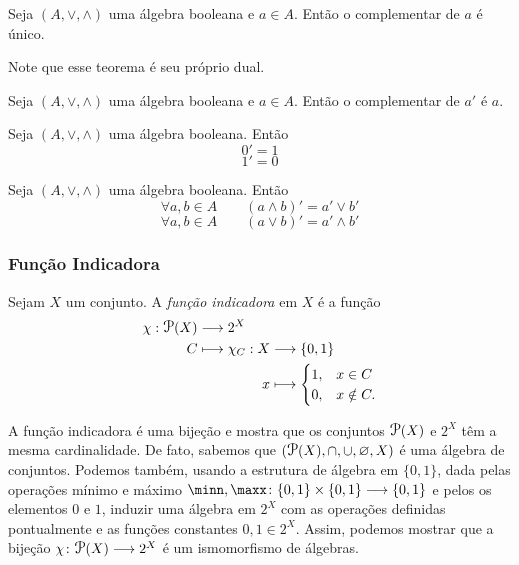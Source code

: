 \begin{teo}
	Seja $(A, \vee ,\wedge)$ uma álgebra booleana e $a \in A$. Então o complementar de $a$ é único.
\end{teo}

	Note que esse teorema é seu próprio dual.

\begin{teo}
	Seja $(A, \vee ,\wedge)$ uma álgebra booleana e $a \in A$. Então o complementar de $a'$ é $a$.
\end{teo}

\begin{teo}
	Seja $(A, \vee ,\wedge)$ uma álgebra booleana. Então
	\begin{equation*}
	0'=1
	\end{equation*}
	\begin{equation*}
	1'=0
	\end{equation*}
\end{teo}

\begin{teo}
\label{prop:de.morgan}
	Seja $(A, \vee ,\wedge)$ uma álgebra booleana. Então
	\begin{equation*}
	\forall a,b \in A \qquad (a \wedge b)'=a' \vee b'
	\end{equation*}
	\begin{equation*}
	\forall a,b \in A \qquad (a  \vee  b)'=a' \wedge b'
	\end{equation*}
\end{teo}

\subsubsection{Função Indicadora}

\begin{defi}
Sejam $X$ um conjunto. A \emph{função indicadora} em $X$ é a função
	\begin{align*}
	\func{\idc}{\p(X)}{2^X}{C}{
		\begin{aligned}[t]
		\func{\idc_C}{X}{\{0,1\}}{x}{
			\begin{cases}
			1,& x \in C \\
			0,& x \notin C.
			\end{cases}
		}
		\end{aligned}
	}
	\end{align*}
\end{defi}

A função indicadora é uma bijeção e mostra que os conjuntos $\p(X)$ e $2^X$ têm a mesma cardinalidade. De fato, sabemos que $(\p(X),\cap,\cup,\emptyset,X)$ é uma álgebra de conjuntos. Podemos também, usando a estrutura de álgebra em $\{0,1\}$, dada pelas operações mínimo e máximo $\minn,\maxx\colon \{0,1\} \times \{0,1\} \to \{0,1\}$ e pelos os elementos $0$ e $1$, induzir uma álgebra em $2^X$ com as operações definidas pontualmente e as funções constantes $0,1 \in 2^X$. Assim, podemos mostrar que a bijeção $\idc\colon \p(X) \to 2^X$ é um ismomorfismo de álgebras.


